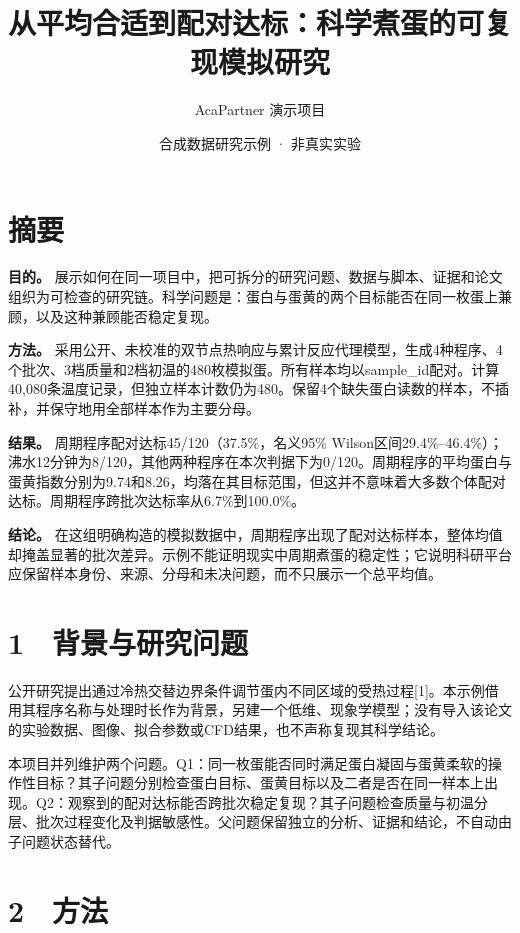 \documentclass[
  chinese,
  a4paper,
  fontset=fandol]{ctexart}
\title{从平均合适到配对达标：科学煮蛋的可复现模拟研究}
\author{AcaPartner 演示项目}
\date{合成数据研究示例 · 非真实实验}
\begin{document}
\maketitle

\section{摘要}\label{ux6458ux8981}

\textbf{目的。}
展示如何在同一项目中，把可拆分的研究问题、数据与脚本、证据和论文组织为可检查的研究链。科学问题是：蛋白与蛋黄的两个目标能否在同一枚蛋上兼顾，以及这种兼顾能否稳定复现。

\textbf{方法。}
采用公开、未校准的双节点热响应与累计反应代理模型，生成4种程序、4个批次、3档质量和2档初温的480枚模拟蛋。所有样本均以sample\_id配对。计算40,080条温度记录，但独立样本计数仍为480。保留4个缺失蛋白读数的样本，不插补，并保守地用全部样本作为主要分母。

\textbf{结果。} 周期程序配对达标45/120（37.5\%，名义95\%
Wilson区间29.4\%--46.4\%）；沸水12分钟为8/120，其他两种程序在本次判据下为0/120。周期程序的平均蛋白与蛋黄指数分别为9.74和8.26，均落在其目标范围，但这并不意味着大多数个体配对达标。周期程序跨批次达标率从6.7\%到100.0\%。

\textbf{结论。}
在这组明确构造的模拟数据中，周期程序出现了配对达标样本，整体均值却掩盖显著的批次差异。示例不能证明现实中周期煮蛋的稳定性；它说明科研平台应保留样本身份、来源、分母和未决问题，而不只展示一个总平均值。

\section{1　背景与研究问题}\label{ux80ccux666fux4e0eux7814ux7a76ux95eeux9898}

公开研究提出通过冷热交替边界条件调节蛋内不同区域的受热过程{[}1{]}。本示例借用其程序名称与处理时长作为背景，另建一个低维、现象学模型；没有导入该论文的实验数据、图像、拟合参数或CFD结果，也不声称复现其科学结论。

本项目并列维护两个问题。Q1：同一枚蛋能否同时满足蛋白凝固与蛋黄柔软的操作性目标？其子问题分别检查蛋白目标、蛋黄目标以及二者是否在同一样本上出现。Q2：观察到的配对达标能否跨批次稳定复现？其子问题检查质量与初温分层、批次过程变化及判据敏感性。父问题保留独立的分析、证据和结论，不自动由子问题状态替代。

\section{2　方法}\label{ux65b9ux6cd5}
\end{document}
